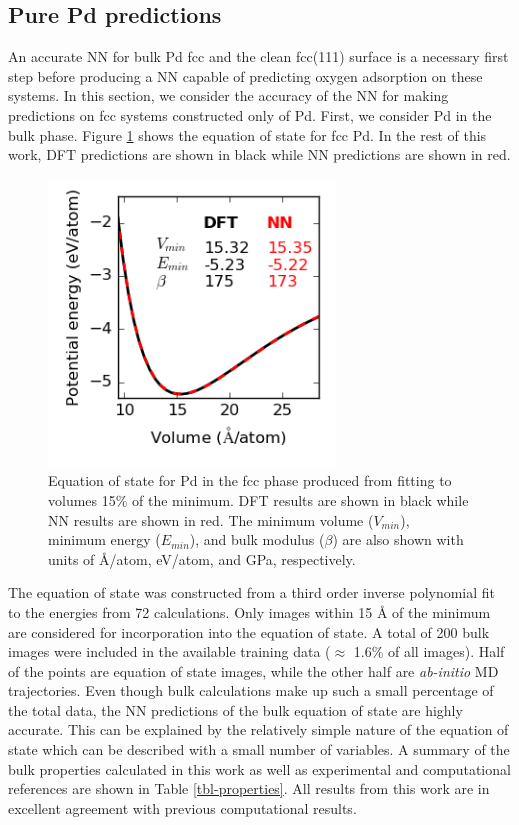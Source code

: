 \documentclass[12pt]{cmuthesis}
\begin{document}
\subsection{Pure Pd predictions}
\label{sec:org8fbb067}
An accurate NN for bulk Pd fcc and the clean fcc(111) surface is a necessary first step before producing a NN capable of predicting oxygen adsorption on these systems. In this section, we consider the accuracy of the NN for making predictions on fcc systems constructed only of Pd. First, we consider Pd in the bulk phase. Figure \ref{fig-eos} shows the equation of state for fcc Pd. In the rest of this work, DFT predictions are shown in black while NN predictions are shown in red.

\begin{figure}[htbp]
\centering
\includegraphics[width=3in]{./images/Pd-eos.png}
\caption{\label{fig-eos}
Equation of state for Pd in the fcc phase produced from fitting to volumes \textpm{} 15\% of the minimum. DFT results are shown in black while NN results are shown in red. The minimum volume (\(V_{min}\)), minimum energy (\(E_{min}\)), and bulk modulus (\(\beta\)) are also shown with units of \AA{}/atom, eV/atom, and GPa, respectively.}
\end{figure}

The equation of state was constructed from a third order inverse polynomial fit \cite{alchagirov-2003-reply-commen} to the energies from 72 calculations. Only images within \textpm{} 15 \AA{} of the minimum are considered for incorporation into the equation of state. A total of 200 bulk images were included in the available training data (\(\approx\) 1.6\% of all images). Half of the points are equation of state images, while the other half are \emph{ab-initio} MD trajectories. Even though bulk calculations make up such a small percentage of the total data, the NN predictions of the bulk equation of state are highly accurate. This can be explained by the relatively simple nature of the equation of state which can be described with a small number of variables. A summary of the bulk properties calculated in this work as well as experimental and computational references are shown in Table \ref{tbl-properties}. All results from this work are in excellent agreement with previous computational results.
\end{document}
